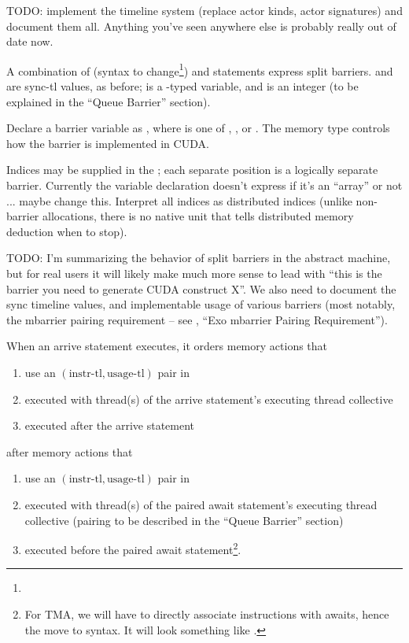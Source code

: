 \filbreak
TODO: implement the timeline system (replace actor kinds, actor signatures) and document them all.
Anything you've seen anywhere else is probably really out of date now.

\filbreak
{}

A combination of  (syntax to change\footnote{}) and  statements express split barriers.
 and  are sync-tl values, as before;  is a -typed variable, and  is an integer (to be explained in the ``Queue Barrier'' section).

\filbreak
Declare a barrier variable as , where  is one of , , or .
The memory type controls how the barrier is implemented in CUDA.

\filbreak
Indices may be supplied in the ; each separate position is a logically separate barrier.
Currently the  variable declaration doesn't express if it's an ``array'' or not ... maybe change this.
Interpret all indices as distributed indices (unlike non-barrier allocations, there is no native unit that tells distributed memory deduction when to stop).

\filbreak
TODO: I'm summarizing the behavior of split barriers in the abstract machine, but for real users it will likely make much more sense to lead with ``this is the barrier you need to generate CUDA construct X''.
We also need to document the sync timeline values, and implementable usage of various barriers (most notably, the mbarrier pairing requirement -- see , ``Exo mbarrier Pairing Requirement'').

\filbreak
When an arrive statement executes, it orders memory actions that
\begin{enumerate}
  \item use an $(\text{instr-tl}, \text{usage-tl})$ pair in 
  \item executed with thread(s) of the arrive statement's executing thread collective
  \item executed after the arrive statement
\end{enumerate}
\filbreak
after memory actions that
\begin{enumerate}
  \item use an $(\text{instr-tl}, \text{usage-tl})$ pair in 
  \item executed with thread(s) of the paired await statement's executing thread collective (pairing to be described in the ``Queue Barrier'' section)
  \item executed before the paired await statement\footnote{For TMA, we will have to directly associate instructions with awaits, hence the move to \lighttt{>>} syntax. It will look something like .}.
\end{enumerate}

